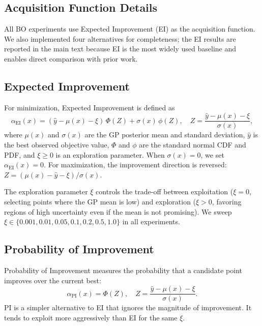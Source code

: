 \documentclass[12pt,a4paper]{article}%
\theoremstyle{plain}%
\theoremstyle{remark}%
\theoremstyle{definition}%
\begin{document}
\begin{appendices}
\section{Acquisition Function Details}\label{sec:acquisition_functions}

All BO experiments use Expected Improvement (EI) as the acquisition function. We also implemented four alternatives for completeness; the EI results are reported in the main text because EI is the most widely used baseline and enables direct comparison with prior work.

\subsection{Expected Improvement}\label{subsec:app_ei}

For minimization, Expected Improvement is defined as
\begin{equation}\label{eq:ei}
    \alpha_\text{EI}(x) = (\hat{y} - \mu(x) - \xi)\,\Phi(Z) + \sigma(x)\,\phi(Z), \quad Z = \frac{\hat{y} - \mu(x) - \xi}{\sigma(x)},
\end{equation}
where $\mu(x)$ and $\sigma(x)$ are the GP posterior mean and standard deviation, $\hat{y}$ is the best observed objective value, $\Phi$ and $\phi$ are the standard normal CDF and PDF, and $\xi \geq 0$ is an exploration parameter. When $\sigma(x) = 0$, we set $\alpha_\text{EI}(x) = 0$. For maximization, the improvement direction is reversed: $Z = (\mu(x) - \hat{y} - \xi) / \sigma(x)$.

The exploration parameter $\xi$ controls the trade-off between exploitation ($\xi = 0$, selecting points where the GP mean is low) and exploration ($\xi > 0$, favoring regions of high uncertainty even if the mean is not promising). We sweep $\xi \in \{0.001, 0.01, 0.05, 0.1, 0.2, 0.5, 1.0\}$ in all experiments.

\subsection{Probability of Improvement}\label{subsec:app_pi}

Probability of Improvement measures the probability that a candidate point improves over the current best:
\begin{equation}\label{eq:pi}
    \alpha_\text{PI}(x) = \Phi(Z), \quad Z = \frac{\hat{y} - \mu(x) - \xi}{\sigma(x)}.
\end{equation}
PI is a simpler alternative to EI that ignores the magnitude of improvement. It tends to exploit more aggressively than EI for the same $\xi$.


\end{appendices}
\end{document}
